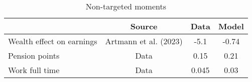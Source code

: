 \begin{table}[htbp]\caption{Non-targeted moments}\label{table:nontargeted_moments}\centering\footnotesize\begin{tabular}{lccc} \toprule  &  Source& Data & Model  \\\midrule    Wealth effect on earnings      & Artmann et al. (2023)          & -5.1 &-0.74\\ Pension points                & Data                           & 0.15 &0.21\\ Work full time              & Data                             & 0.045 &0.03\\  \bottomrule\end{tabular}\end{table}
